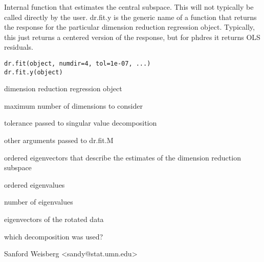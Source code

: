 \begin{Description}\relax
Internal function that estimates the central subspace.  This will not
typically be called directly by the user.  dr.fit.y is the generic name
of a function that returns the response for the particular dimension
reduction regression object.  Typically, this just returns a centered
version of the response, but for phdres it returns OLS residuals.\end{Description}
\begin{Usage}
\begin{verbatim}
dr.fit(object, numdir=4, tol=1e-07, ...)
dr.fit.y(object)
\end{verbatim}
\end{Usage}
\begin{Arguments}
\begin{ldescription}
\item[\code{object}] dimension reduction regression object 
\item[\code{numdir}] maximum number of dimensions to consider 
\item[\code{tol}] tolerance passed to singular value decomposition 
\item[\code{...}] other arguments passed to dr.fit.M 
\end{ldescription}
\end{Arguments}
\begin{Value}
\begin{ldescription}
\item[\code{evectors }] ordered eigenvectors that describe the estimates of the 
dimension reduction subspace
\item[\code{evalues }] ordered eigenvalues
\item[\code{numdir}] number of eigenvalues
\item[\code{raw.evectors}] eigenvectors of the rotated data
\item[\code{decomp}] which decomposition was used?
\end{ldescription}
\end{Value}
\begin{Author}\relax
Sanford Weisberg <sandy@stat.umn.edu>\end{Author}
\begin{SeeAlso}\relax
{}\end{SeeAlso}

